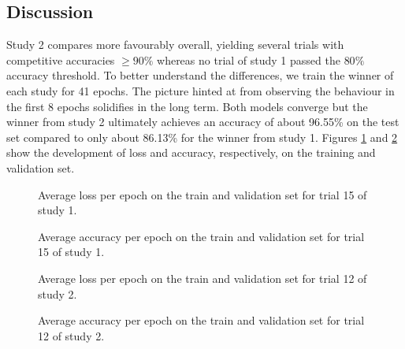 \documentclass[british,12p]{article}
\begin{document}
	\subsection{Discussion}
    Study 2 compares more favourably overall, yielding several trials with competitive accuracies $\ge 90\%$ whereas no trial of study 1 passed the $80\%$ accuracy threshold. To better understand the differences, we train the winner of each study for 41 epochs. The picture hinted at from observing the behaviour in the first 8 epochs solidifies in the long term. Both models converge but the winner from study 2 ultimately achieves an accuracy of about 96.55\% on the test set compared to only about 86.13\% for the winner from study 1. Figures \ref{fig-trial-1-15-loss} and \ref{fig-trial-1-15-acc} show the development of loss and accuracy, respectively, on the training and validation set. 
    \begin{figure}[hbt]
    	\begin{center}
  			\caption{Average loss per epoch on the train and validation set for trial 15 of study 1.}
  			\label{fig-trial-1-15-loss}
  		\end{center}
	\end{figure}
	\begin{figure}[hbt]
		\begin{center}
  			\caption{Average accuracy per epoch on the train and validation set for trial 15 of study 1.}
  			\label{fig-trial-1-15-acc}
  		\end{center}
	\end{figure}
	
	\begin{figure}[hbt]
    	\begin{center}
  			\caption{Average loss per epoch on the train and validation set for trial 12 of study 2.}
  			\label{fig-trial-2-12-loss}
  		\end{center}
	\end{figure}
	\begin{figure}[hbt]
		\begin{center}
  			\caption{Average accuracy per epoch on the train and validation set for trial 12 of study 2.}
  			\label{fig-trial-2-12-acc}
  		\end{center}
	\end{figure}
\end{document}
